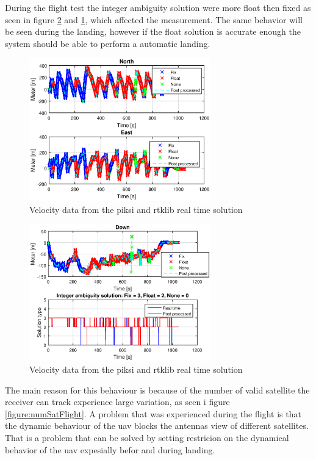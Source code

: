 During the flight test the integer ambiguity solution were more float then fixed as seen in figure \ref{figure:DownFlight} and \ref{figure:northEastFlight}, which affected the measurement. The same behavior will be seen during the landing, however if the float solution is accurate enough the system should be able to perform a automatic landing.
\begin{figure}[H]
	\centering
		\includegraphics[width=0.7\textwidth]{figs/plots/northEastFlight.eps}
		\caption{Velocity data from the piksi and rtklib real time solution}
		\label{figure:northEastFlight}
\end{figure}
\begin{figure}[H]
	\centering
		\includegraphics[width=0.7\textwidth]{figs/plots/downFlight.eps}
		\caption{Velocity data from the piksi and rtklib real time solution}
		\label{figure:DownFlight}
\end{figure}
The main reason for this behaviour is because of the number of valid satellite the receiver can track experience large variation, as seen i figure \ref{figure:numSatFlight}. A problem that was experienced during the flight is that the dynamic behaviour of the \gls{uav} blocks the antennas view of different satellites. That is a problem that can be solved by setting restricion on the dynamical behavior of the \gls{uav} expesially befor and during landing.
